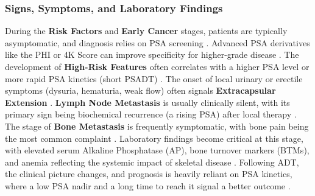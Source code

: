 \documentclass[11pt, a4paper]{article}
\begin{document}
\subsubsection{Signs, Symptoms, and Laboratory Findings}
During the \textbf{Risk Factors} and \textbf{Early Cancer} stages, patients are typically asymptomatic, and diagnosis relies on PSA screening \cite{PasoglouMichoux2016}. Advanced PSA derivatives like the PHI or 4K Score can improve specificity for higher-grade disease \cite{ChenWang2023}. The development of \textbf{High-Risk Features} often correlates with a higher PSA level or more rapid PSA kinetics (short PSADT) \cite{HesterbergGordetsky2021, Tisman2013}. The onset of local urinary or erectile symptoms (dysuria, hematuria, weak flow) often signals \textbf{Extracapsular Extension} \cite{PasoglouMichoux2016, BalzsAntal2021, HeZhong2024}. \textbf{Lymph Node Metastasis} is usually clinically silent, with its primary sign being biochemical recurrence (a rising PSA) after local therapy \cite{CaglicBarrett2018}. The stage of \textbf{Bone Metastasis} is frequently symptomatic, with bone pain being the most common complaint \cite{UnknownAuthor2014}. Laboratory findings become critical at this stage, with elevated serum Alkaline Phosphatase (AP), bone turnover markers (BTMs), and anemia reflecting the systemic impact of skeletal disease \cite{GoodeWang2023, UnknownAuthor2014}. Following ADT, the clinical picture changes, and prognosis is heavily reliant on PSA kinetics, where a low PSA nadir and a long time to reach it signal a better outcome \cite{BellmuntKheoh2016, OKAHATANO2024, HuMao2023}.
\end{document}
